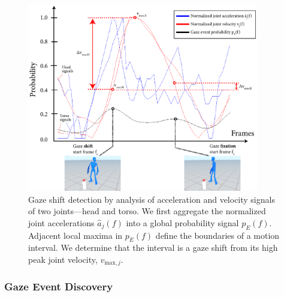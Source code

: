 \begin{figure}
\centering
\includegraphics[width=0.9\textwidth]{gazeauthoring/Figures/GazeInstanceInference.pdf}
\caption{Gaze shift detection by analysis of acceleration and velocity signals of two joints---head and torso. We first aggregate the normalized joint accelerations $\hat{a}_j(f)$ into a global probability signal $p_E(f)$. Adjacent local maxima in $p_E(f)$ define the boundaries of a motion interval. We determine that the interval is a gaze shift from its high peak joint velocity, $v_{\mathrm{max},j}$.}
\label{fig:GazeInstanceInference}
\end{figure}

\subsubsection{Gaze Event Discovery}

